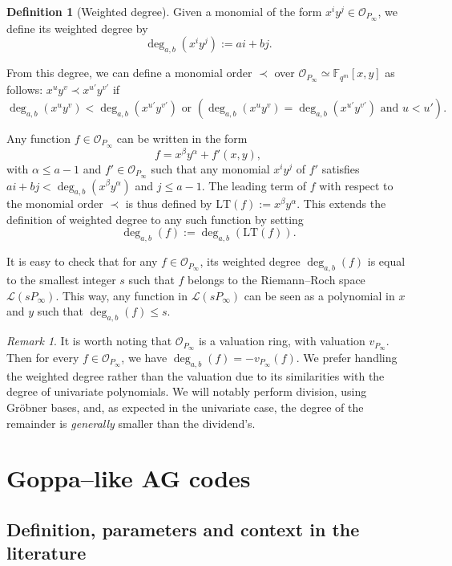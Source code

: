 \documentclass[a4paper]{amsart}
\theoremstyle{definition}
\newtheorem{definition}[thm]{Definition}
\theoremstyle{remark}
\newtheorem{remark}[thm]{Remark}
\newcommand{\calL}{\mathcal{L}}
\newcommand{\calO}{\mathcal{O}}
\newcommand{\fqm}{\mathbb{F}_{q^m}}
\newcommand{\degab}[1]{\deg_{a,b}\left(#1\right)}
\begin{document}
\begin{definition}[Weighted degree]
Given a monomial of the form $x^iy^j \in \calO_{P_\infty}$, we define its weighted degree by
\[ \degab{x^iy^j} := ai+bj.\]

From this degree, we can define a monomial order $\prec$ over $\calO_{P_\infty} \simeq \fqm[x,y]$ as follows: $x^uy^v \prec x^{u'}y^{v'}$ if
\begin{equation}\label{eq:def_mon_order}
\degab{x^uy^v} < \degab{x^{u'}y^{v'}} \text{ or } \left(\degab{x^uy^v} = \degab{x^{u'}y^{v'}}  \text{ and } u < u'\right).
\end{equation}

%
Any function $f \in \calO_{P_\infty}$ can be written in the form $$f = x^{\beta}y^{\alpha} + f'(x,y),$$
with $\alpha \leq a-1$ and $f' \in \calO_{P_\infty}$ such that any monomial $x^iy^j$ of $f'$ satisfies $ai+bj < \degab{x^{\beta}y^{\alpha}}$ and $j \leq a-1$. The leading term of $f$ with respect to the monomial order $\prec$ is thus defined by $\mathrm{LT}(f) := x^{\beta}y^{\alpha}$. This extends the definition of weighted degree to any such function by setting 
\[\degab{f} := \degab{\mathrm{LT}(f)}.\]
\end{definition}
It is easy to check that for any $f \in \calO_{P_\infty}$, its weighted degree $\degab{f}$ is equal to the smallest integer $s$ such that $f$ belongs to the Riemann--Roch space $\calL(sP_{\infty})$.
%
This way, any function in $\calL(sP_\infty)$ can be seen as a polynomial in $x$ and $y$ such that $\degab{f}\leq s$. 
\begin{remark}
It is worth noting that $\calO_{P_\infty}$ is a valuation ring, with valuation $v_{P_\infty}$. Then for every $f \in \calO_{P_\infty}$, we have $\degab{f}=-v_{P_\infty}(f)$. We prefer handling the weighted degree rather than the valuation due to its similarities with the degree of univariate 
polynomials. We will notably perform division, using Gr\"obner bases, and, as expected in the univariate case, the degree of the remainder is 
\textit{generally} smaller than the dividend's.
\end{remark}


\section{Goppa--like AG codes}\label{sec:Goppa}
\subsection{Definition, parameters and context in the literature}\label{subsec:def-Goppa}
\end{document}

